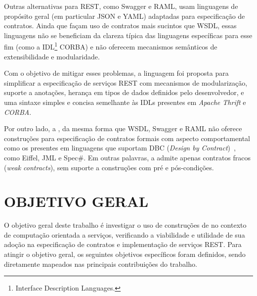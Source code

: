 Outras alternativas para REST, como Swagger\cite{swaggerSite} e
RAML\cite{RAML}, usam linguagens de propósito geral (em
particular JSON\cite{JSon} e YAML\cite{YAML}) adaptadas para especificação de
contratos.
Ainda que façam uso de contratos mais sucintos que WSDL, essas linguagens não se
beneficiam da clareza típica das linguagens específicas para esse fim (como
a IDL\footnote{Interface Description
Languages.} CORBA\cite{corba}) e não oferecem
mecanismos semânticos de extensibilidade e modularidade.

Com o objetivo de mitigar esses problemas, a linguagem \neoidl{} foi proposta
para simplificar a especificação de serviços REST com mecanismos de modularização,
suporte a anotações, herança em tipos de dados definidos pelo desenvolvedor, e
uma sintaxe simples e concisa semelhante às IDLs presentes em \emph{Apache
Thrift}\texttrademark\cite{thrift} e \emph{CORBA}\texttrademark\cite{corba}.

Por outro lado, a \neoidl{}, da mesma forma que WSDL,
Swagger e RAML não oferece construções para especificação de contratos formais
com aspecto comportamental como os presentes em linguagens que
suportam DBC (\emph{Design by Contract})~\cite{meyer1992applying}, como
Eiffel, JML e Spec\#. Em outras palavras, a \neoidl{}  admite apenas
contratos fracos (\textit{weak contracts}), sem suporte a construções com pré e
pós-condições.



\section{OBJETIVO GERAL}
\label{ObjGeral}
\vspace{-6mm}

O objetivo geral deste trabalho é investigar o uso de construções de
\designbycontract{} no contexto de computação orientada a serviços, verificando a
viabilidade e utilidade de sua adoção na especificação de contratos e
implementação de serviços REST. Para atingir o objetivo geral, os seguintes 
objetivos específicos foram definidos, sendo diretamente mapeados nas 
principais contribuições do trabalho. 

\vspace{-6mm}

